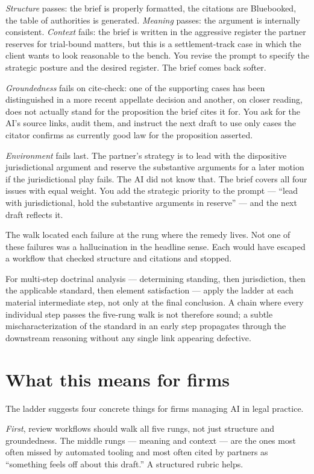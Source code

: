 \documentclass[11pt,a4paper]{article}
\begin{document}
\emph{Structure} passes: the brief is properly formatted, the
citations are Bluebooked, the table of authorities is generated.
\emph{Meaning} passes: the argument is internally consistent.
\emph{Context} fails: the brief is written in the aggressive
register the partner reserves for trial-bound matters, but this is
a settlement-track case in which the client wants to look
reasonable to the bench. You revise the prompt to specify the
strategic posture and the desired register. The brief comes back
softer.

\emph{Groundedness} fails on cite-check: one of the supporting
cases has been distinguished in a more recent appellate decision
and another, on closer reading, does not actually stand for the
proposition the brief cites it for. You ask for the AI's source
links, audit them, and instruct the next draft to use only cases
the citator confirms as currently good law for the proposition
asserted.

\emph{Environment} fails last. The partner's strategy is to lead
with the dispositive jurisdictional argument and reserve the
substantive arguments for a later motion if the jurisdictional
play fails. The AI did not know that. The brief covers all four
issues with equal weight. You add the strategic priority to the
prompt --- ``lead with jurisdictional, hold the substantive
arguments in reserve'' --- and the next draft reflects it.

The walk located each failure at the rung where the remedy lives.
Not one of these failures was a hallucination in the headline
sense. Each would have escaped a workflow that checked structure
and citations and stopped.

For multi-step doctrinal analysis --- determining standing, then
jurisdiction, then the applicable standard, then element
satisfaction --- apply the ladder at each material intermediate
step, not only at the final conclusion. A chain where every
individual step passes the five-rung walk is not therefore sound;
a subtle mischaracterization of the standard in an early step
propagates through the downstream reasoning without any single
link appearing defective.

\section*{What this means for firms}

The ladder suggests four concrete things for firms managing AI in
legal practice.

\emph{First}, review workflows should walk all five rungs, not
just structure and groundedness. The middle rungs --- meaning and
context --- are the ones most often missed by automated tooling
and most often cited by partners as ``something feels off about
this draft.'' A structured rubric helps.
\end{document}
